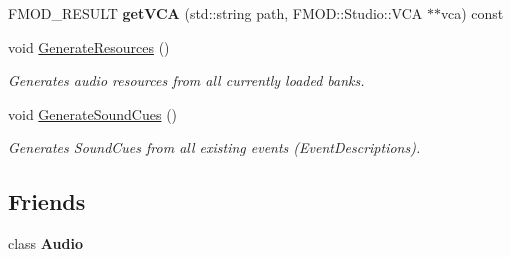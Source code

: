 \begin{DoxyCompactItemize}
\item 
\hypertarget{classDCEngine_1_1Systems_1_1AudioFMOD_a68e5d11a5762f20017d45c583f42f9ad}{F\-M\-O\-D\-\_\-\-R\-E\-S\-U\-L\-T {\bfseries get\-V\-C\-A} (std\-::string path, F\-M\-O\-D\-::\-Studio\-::\-V\-C\-A $\ast$$\ast$vca) const }\label{classDCEngine_1_1Systems_1_1AudioFMOD_a68e5d11a5762f20017d45c583f42f9ad}

\item 
\hypertarget{classDCEngine_1_1Systems_1_1AudioFMOD_aa14e87341a443a510872681f9536cf64}{void \hyperlink{classDCEngine_1_1Systems_1_1AudioFMOD_aa14e87341a443a510872681f9536cf64}{Generate\-Resources} ()}\label{classDCEngine_1_1Systems_1_1AudioFMOD_aa14e87341a443a510872681f9536cf64}

\begin{DoxyCompactList}\small\item\em Generates audio resources from all currently loaded banks. \end{DoxyCompactList}\item 
\hypertarget{classDCEngine_1_1Systems_1_1AudioFMOD_a6c00642a03dc8a2733ad6671ff982e92}{void \hyperlink{classDCEngine_1_1Systems_1_1AudioFMOD_a6c00642a03dc8a2733ad6671ff982e92}{Generate\-Sound\-Cues} ()}\label{classDCEngine_1_1Systems_1_1AudioFMOD_a6c00642a03dc8a2733ad6671ff982e92}

\begin{DoxyCompactList}\small\item\em Generates Sound\-Cues from all existing events (Event\-Descriptions). \end{DoxyCompactList}\end{DoxyCompactItemize}
\subsection*{Friends}
\begin{DoxyCompactItemize}
\item 
\hypertarget{classDCEngine_1_1Systems_1_1AudioFMOD_a211f008bd6a46efe478fe81d31e28933}{class {\bfseries Audio}}\label{classDCEngine_1_1Systems_1_1AudioFMOD_a211f008bd6a46efe478fe81d31e28933}

\end{DoxyCompactItemize}


